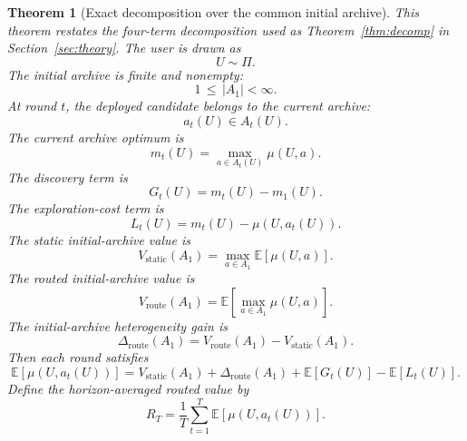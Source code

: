 \documentclass{article} %
\newtheorem{theorem}{Theorem}
\begin{document}
\begin{theorem}[Exact decomposition over the common initial archive]
\label{thm:main}
This theorem restates the four-term decomposition used as Theorem~\ref{thm:decomp} in Section~\ref{sec:theory}.  The user is drawn as
\begin{equation}
\label{eq:app-thm-user}
U\sim \Pi.
\end{equation}
The initial archive is finite and nonempty:
\begin{equation}
\label{eq:app-thm-initial}
1\,\le\, |A_1|<\infty.
\end{equation}
At round \(t\), the deployed candidate belongs to the current archive:
\begin{equation}
\label{eq:app-thm-action}
a_t(U)\in A_t(U).
\end{equation}
The current archive optimum is
\begin{equation}
\label{eq:app-thm-mt}
m_t(U)
=
\max_{a\in A_t(U)}\mu(U,a).
\end{equation}
The discovery term is
\begin{equation}
\label{eq:app-thm-gt}
G_t(U)
=
m_t(U)-m_1(U).
\end{equation}
The exploration-cost term is
\begin{equation}
\label{eq:app-thm-lt}
L_t(U)
=
m_t(U)-\mu(U,a_t(U)).
\end{equation}
The static initial-archive value is
\begin{equation}
\label{eq:app-thm-vstatic}
V_{\mathrm{static}}(A_1)
=
\max_{a\in A_1}\mathbb{E}[\mu(U,a)].
\end{equation}
The routed initial-archive value is
\begin{equation}
\label{eq:app-thm-vroute}
V_{\mathrm{route}}(A_1)
=
\mathbb{E}\!\left[\max_{a\in A_1}\mu(U,a)\right].
\end{equation}
The initial-archive heterogeneity gain is
\begin{equation}
\label{eq:app-thm-delta}
\Delta_{\mathrm{route}}(A_1)
=
V_{\mathrm{route}}(A_1)-V_{\mathrm{static}}(A_1).
\end{equation}
Then each round satisfies
\begin{equation}
\label{eq:app-thm-per-round}
\mathbb{E}[\mu(U,a_t(U))]
=
V_{\mathrm{static}}(A_1)
+
\Delta_{\mathrm{route}}(A_1)
+
\mathbb{E}[G_t(U)]
-
\mathbb{E}[L_t(U)].
\end{equation}
Define the horizon-averaged routed value by
\begin{equation}
\label{eq:app-thm-rt}
R_T
=
\frac{1}{T}\sum_{t=1}^{T}\mathbb{E}[\mu(U,a_t(U))].

\end{equation}
\end{theorem}
\end{document}
